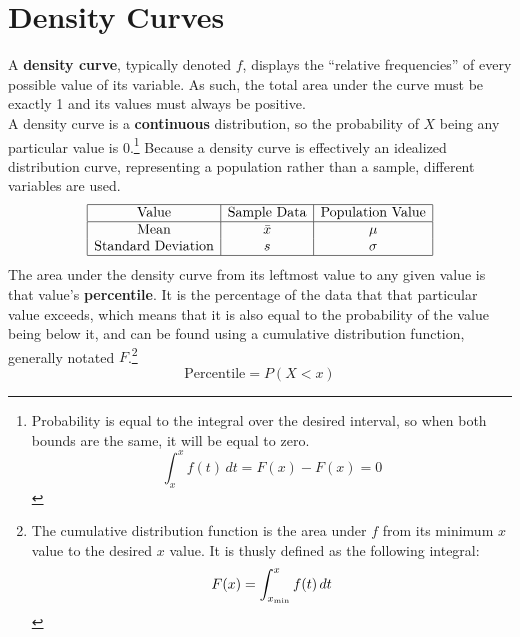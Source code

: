 \documentclass[../AP_Statistics.tex]{subfiles}
\begin{document}
		\section{Density Curves}
			A \textbf{density curve}, typically denoted $f$, displays the \enquote{relative frequencies} of every possible value of its variable. As such, the total area under the curve must be exactly 1 and its values must always be positive. \\ 
			A density curve is a \textbf{continuous} distribution, so the probability of $X$ being any particular value is 0.\footnote{Probability is equal to the integral over the desired interval, so when both bounds are the same, it will be equal to zero.\[\int_x^xf(t)\,dt = F(x) - F(x) = 0\]}
			Because a density curve is effectively an idealized distribution curve, representing a population rather than a sample, different variables are used. \\ 
			\[\begin{array}{|c|c|c|}\hline
				\rm{Value} & \text{Sample Data} & \text{Population Value} \\\hline
				\rm{Mean} & \bar{x} & \mu \\
				\text{Standard Deviation} & s & \sigma \\\hline
			\end{array}\]
			The area under the density curve from its leftmost value to any given value is that value's \textbf{percentile}. It is the percentage of the data that that particular value exceeds, which means that it is also equal to the probability of the value being below it, and can be found using a cumulative distribution function, generally notated $F$.\footnote{The cumulative distribution function is the area under $f$ from its minimum $x$ value to the desired $x$ value. It is thusly defined as the following integral:\[F(x) = \int_{x_{\mathrm{min}}}^xf(t)\,dt\]}
			\[\mathrm{Percentile} = P(X < x)\]
\end{document}
